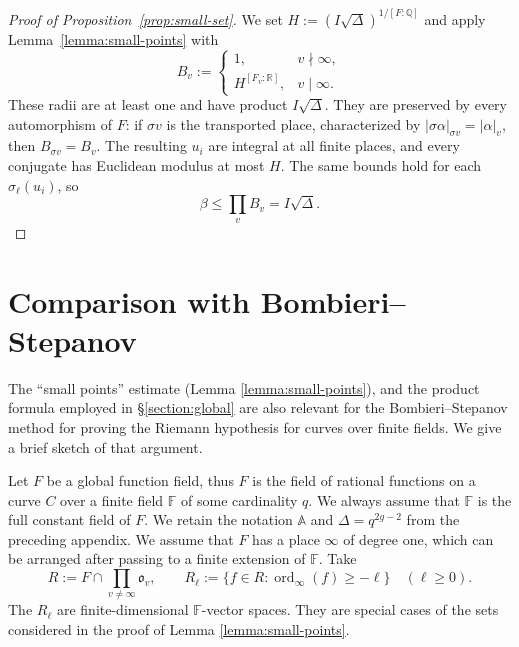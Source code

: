 \documentclass[reqno]{amsart} 
\begin{document}
\begin{proof}[Proof of Proposition~\ref{prop:small-set}]
  We set $H:=(I\sqrt\Delta)^{1/[F:\mathbb Q]}$ and apply Lemma~\ref{lemma:small-points} with
  \begin{equation*}
    B_v:=
    \begin{cases}
      1,&v\nmid\infty,\\
      H^{[F_v:\mathbb R]},&v\mid\infty.
    \end{cases}
  \end{equation*}
  These radii are at least one and have product $I\sqrt\Delta$.  They are preserved by every automorphism of $F$: if $\sigma v$ is the transported place, characterized by $|\sigma\alpha|_{\sigma v}=|\alpha|_v$, then $B_{\sigma v}=B_v$.  The resulting $u_i$ are integral at all finite places, and every conjugate has Euclidean modulus at most $H$.  The same bounds hold for each $\sigma_\ell(u_i)$, so
  \begin{equation*}
    \beta\leq\prod_vB_v=I\sqrt\Delta.
  \end{equation*}
\end{proof}

\section{Comparison with Bombieri--Stepanov}\label{section:stepanov}

The ``small points'' estimate (Lemma \ref{lemma:small-points}), and the product formula employed in \S\ref{section:global} are also relevant for the Bombieri--Stepanov method \cite{Bombieri1974CountingPoints} for proving the Riemann hypothesis for curves over finite fields.  We give a brief sketch of that argument.

Let $F$ be a global function field, thus $F$ is the field of rational functions on a curve $C$ over a finite field $\mathbb{F}$ of some cardinality $q$.  We always assume that $\mathbb{F}$ is the full constant field of $F$.  We retain the notation $\mathbb{A}$ and $\Delta = q^{2 g - 2}$ from the preceding appendix.  We assume that $F$ has a place $\infty$ of degree one, which can be arranged after passing to a finite extension of $\mathbb{F}$.  Take
\begin{equation*}
  R:=F\cap\prod_{v\ne\infty}\mathfrak{o}_v,
  \qquad
  R_\ell:=\{f\in R:\operatorname{ord}_\infty(f)\geq-\ell\}
  \quad(\ell\geq0).
\end{equation*}
The $R_\ell$ are finite-dimensional $\mathbb{F}$-vector spaces.  They are special cases of the sets considered in the proof of Lemma \ref{lemma:small-points}.
\end{document}
